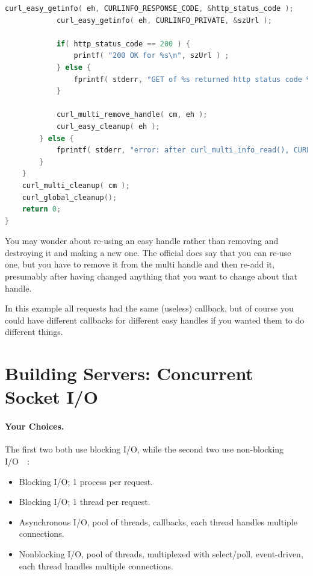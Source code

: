 \documentclass[a4paper]{report}
\begin{document}
\begin{lstlisting}[language=C]
            curl_easy_getinfo( eh, CURLINFO_RESPONSE_CODE, &http_status_code );
            curl_easy_getinfo( eh, CURLINFO_PRIVATE, &szUrl );

            if( http_status_code == 200 ) {
                printf( "200 OK for %s\n", szUrl ) ;
            } else {
                fprintf( stderr, "GET of %s returned http status code %d\n", szUrl, http_status_code );
            }

            curl_multi_remove_handle( cm, eh );
            curl_easy_cleanup( eh );
        } else {
            fprintf( stderr, "error: after curl_multi_info_read(), CURLMsg=%d\n", msg->msg );
        }
    }
    curl_multi_cleanup( cm );
    curl_global_cleanup();
    return 0;
}
\end{lstlisting}

You may wonder about re-using an easy handle rather than removing and destroying it and making a new one. The official docs say that you can re-use one, but you have to remove it from the multi handle and then re-add it, presumably after having changed anything that you want to change about that handle. 

In this example all requests had the same (useless) callback, but of course you could have different callbacks for different easy handles if you wanted them to do different things. 


\section*{Building Servers: Concurrent Socket I/O}

\paragraph{Your Choices.} The first two both use blocking I/O, while the second two use
non-blocking I/O~~\cite{gplus:concurrent}:
    \begin{itemize}
      \item Blocking I/O; 1 process per request.
      \item Blocking I/O; 1 thread per request.
      \item Asynchronous I/O, pool of threads, callbacks, each thread handles multiple connections.
      \item Nonblocking I/O, pool of threads, multiplexed with select/poll,
        event-driven, each thread handles multiple connections.
    \end{itemize}
\end{document}
